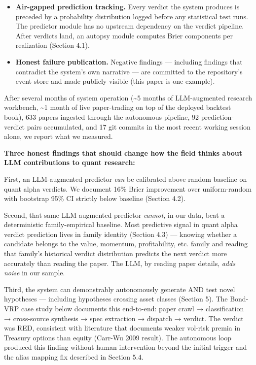 \documentclass[11pt,a4paper]{article}
\begin{document}
\begin{itemize}[leftmargin=*]
\item \textbf{Air-gapped prediction tracking.} Every verdict the system produces is preceded by a probability distribution logged before any statistical test runs. The predictor module has no upstream dependency on the verdict pipeline. After verdicts land, an autopsy module computes Brier components per realization (Section 4.1).
\end{itemize}

\begin{itemize}[leftmargin=*]
\item \textbf{Honest failure publication.} Negative findings — including findings that contradict the system's own narrative — are committed to the repository's event store and made publicly visible (this paper is one example).
\end{itemize}

After several months of system operation (\textasciitilde{}5 months of LLM-augmented research workbench, \textasciitilde{}1 month of live paper-trading on top of the deployed backtest book), 633 papers ingested through the autonomous pipeline, 92 prediction-verdict pairs accumulated, and 17 git commits in the most recent working session alone, we report what we measured.

\textbf{Three honest findings that should change how the field thinks about LLM contributions to quant research:}

First, an LLM-augmented predictor \textit{can} be calibrated above random baseline on quant alpha verdicts. We document 16\% Brier improvement over uniform-random with bootstrap 95\% CI strictly below baseline (Section 4.2).

Second, that same LLM-augmented predictor \textit{cannot}, in our data, beat a deterministic family-empirical baseline. Most predictive signal in quant alpha verdict prediction lives in family identity (Section 4.3) — knowing whether a candidate belongs to the value, momentum, profitability, etc. family and reading that family's historical verdict distribution predicts the next verdict more accurately than reading the paper. The LLM, by reading paper details, \textit{adds noise} in our sample.

Third, the system can demonstrably autonomously generate AND test novel hypotheses — including hypotheses crossing asset classes (Section 5). The Bond-VRP case study below documents this end-to-end: paper crawl → classification → cross-source synthesis → spec extraction → dispatch → verdict. The verdict was RED, consistent with literature that documents weaker vol-risk premia in Treasury options than equity (Carr-Wu 2009 result). The autonomous loop produced this finding without human intervention beyond the initial trigger and the alias mapping fix described in Section 5.4.
\end{document}
